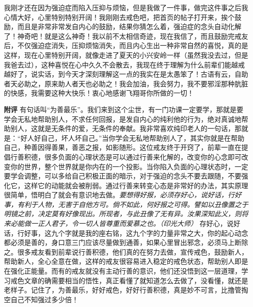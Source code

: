 \begin{case}
    我刚才还在因为强迫症而陷入压抑与烦恼，但是我做了一件事，做完这件事之后我心情大好，心里特别特别开阔！我刚刚去戒色吧，把首页的帖子打开来，挨个鼓励，而且是非常非常发自内心的鼓励，结果你猜怎么着，强迫症的念头自动化解了！神奇吧！就是这么神奇！我以前不太相信奇迹，现在我信了，而且鼓励完戒友后，不仅强迫症消失，压抑烦恼消失，而且内心生出一种非常自然的喜悦，真的是这样，现在心里特别开阔，就像走进了夏天的小兴安岭一样（虽然我没去过，但是我爸去过），这种喜悦在心中久久不会散去，我现在终于理解为什么前辈们能越戒越好了，说实话，到今天才深刻理解这一点的我实在是太愚笨了！古语有云，自助者天必助之，原来助人者天也必助之！我会加油，我会努力，我不要邪淫那种肮脏的快感，我需要这种大快乐！衷心地感谢飞翔哥你所做的一切！

    \textbf{附评} 有句话叫“为善最乐”。我们来到这个尘世，有一门功课一定要学，那就是要学会无私地帮助别人，不求任何回报，是发自内心的纯利他的行为，绝对真诚地帮助别人，这就是无条件的爱，无条件的奉献。我非常喜欢纯印老人的一句话，那就是：“好人好自己，坏人坏自己。”当你学会无私地帮助别人了，其实你就是在帮助自己，种善因得善果，善恶之报，如影随形。这位戒友终于开窍了，前辈一直在提倡行善积德，很多负面的心理状态是可以通过行善来化解的，改变你的心念即可改变你的世界，整个世界就是你内在的一个投影。当你陷入负面的心理状态时，一定要学会调整，可以多给自己积极正面的暗示，对于强迫的念头不要去跟随，不要强化它，这样它的动能就会被削弱。通过行善来转变心态是非常好的办法，其实原理很简单，悟明白了就会有意识地去做。\textit{要想得好报，必须存好心，说好话，行好事，有利于人物，无害于自他方可。倘不如此，何好报之可得。譬如以丑像置之于明镜之前，决定莫有好像现出。所现者，与此丑像了无有异。汝果深知此义，则将来必能做一正人君子，令一切人皆尊重而爱慕之也。（印光大师）} 存好心，说好话，行好事，这九个字就是我的座右铭，这九个字的力量非常之大，你的起心动念都必须是善的，身口意三门应该尽量做到通善，如果心里冒出邪念，必须马上断除之。很多戒友看到前辈说行善积德，他们真的在努力去做，宣传戒色，鼓励新人，帮助新人，全心全意在做，这样的戒友很容易进入稳定的戒色状态，帮助别人即是在强化正能量。而有的戒友就没有主动行善的意识，他们还没悟到这一层道理，学习戒色文章的确需要相当的悟性，真正看懂了就知道怎么去做了，没看懂，就还是老样子。记住了，为善最乐，好好戒色，好好行善积德，真是妙不可言，比撸管掏空自己不知强过多少倍！
\end{case}

